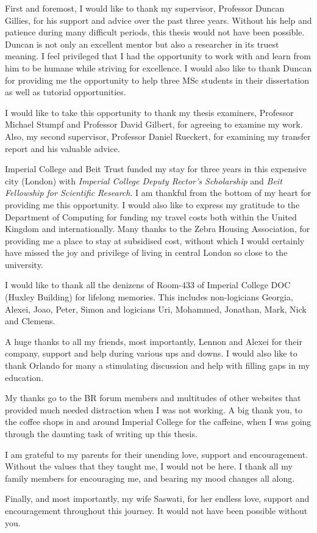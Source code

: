 
\cleardoublepage


\begin{acknowledgements}

First and foremost, I would like to thank my supervisor, Professor Duncan Gillies, for his support and advice over the past three years. Without his help and patience during many difficult periods, this thesis would not have been possible. Duncan is not only an excellent mentor but also a researcher in its truest meaning. I feel privileged that I had the opportunity to work with and learn from him to be humane while striving for excellence. I would also like to thank Duncan for providing me the opportunity to help three MSc students in their dissertation as well as tutorial opportunities. 

I would like to take this opportunity to thank my thesis examiners, Professor Michael Stumpf and Professor David Gilbert, for agreeing to examine my work. Also, my second supervisor, Professor Daniel Rueckert, for examining my transfer report and his valuable advice.

Imperial College and Beit Trust funded my stay for three years in this expensive city (London) with \textit{Imperial College Deputy Rector's Scholarship} and \textit{Beit Fellowship for Scientific Research}. I am thankful from the bottom of my heart for providing me this opportunity. I would also like to express my gratitude to the Department of Computing for funding my travel costs both within the United Kingdom and internationally. Many thanks to the Zebra Housing Association, for providing me a place to stay at subsidised cost, without which I would certainly have missed the joy and privilege of living in central London so close to the university. 

I would like to thank all the denizens of Room-433 of Imperial College DOC (Huxley Building) for lifelong memories. This includes non-logicians Georgia, Alexei, Joao, Peter, Simon and logicians Uri, Mohammed, Jonathan, Mark, Nick and Clemens.
	
A huge thanks to all my friends, most importantly, Lennon and Alexei for their company, support and help during various ups and downs. I would also like to thank Orlando for many a stimulating discussion and help with filling gaps in my education. 

My thanks go to the BR forum members and multitudes of other websites that provided much needed distraction when I was not working. A big thank you, to the coffee shops in and around Imperial College for the caffeine, when I was going through the daunting task of writing up this thesis.

I am grateful to my parents for their unending love, support and encouragement. Without the values that they taught me, I would not be here. I thank all my family members for encouraging me, and bearing my mood changes all along.

Finally, and most importantly, my wife Saswati, for her endless love, support and encouragement throughout this journey. It would not have been possible without you.

\end{acknowledgements}
